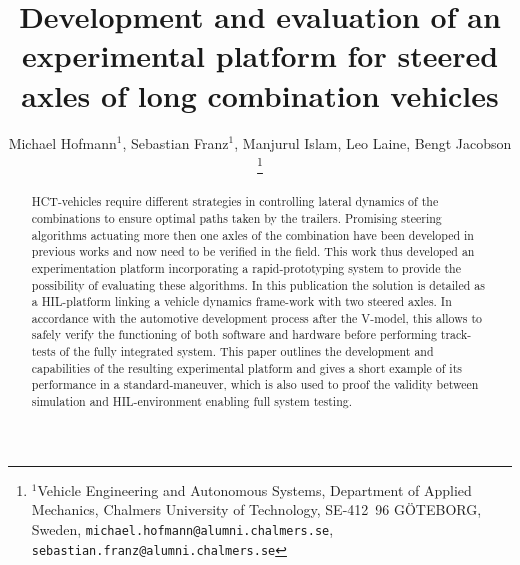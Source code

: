 \documentclass[letterpaper, 11pt, conference]{IEEEconf}      %
\title{\LARGE \bf
Development and evaluation of an experimental platform for steered axles of long combination vehicles}
\author{Michael Hofmann$^{1}$, Sebastian Franz$^{1}$, Manjurul Islam, Leo Laine, Bengt Jacobson%
	\thanks{$^{1}$Vehicle Engineering and Autonomous Systems, Department of Applied Mechanics, Chalmers University of Technology, SE-412~96 G\"OTEBORG, Sweden,
		{\tt\small michael.hofmann@alumni.chalmers.se},
		{\tt\small sebastian.franz@alumni.chalmers.se}}%
}
\begin{document}
\maketitle
\thispagestyle{empty}
\pagestyle{empty}


\begin{abstract}

\gls{HCT}-vehicles require different strategies in controlling lateral dynamics of the combinations to ensure optimal paths taken by the trailers. Promising steering algorithms actuating more then one axles of the combination have been developed in previous works \cite{Lowspeed_paper} and now need to be verified in the field. This work thus developed an experimentation platform incorporating a rapid-prototyping system to provide the possibility of evaluating these algorithms. In this publication the solution is detailed as a \gls{HIL}-platform linking a vehicle dynamics frame-work with two steered axles. In accordance with the automotive development process after the V-model\cite{automotive_software_engineering}, this allows to safely verify the functioning of both software and hardware before performing track-tests of the fully integrated system. This paper outlines the development and capabilities of the resulting experimental platform and gives a short example of its performance in a standard-maneuver, which is also used to proof the validity between simulation and \gls{HIL}-environment enabling full system testing.

\end{abstract}


















\addtolength{\textheight}{-12cm}   %
\end{document}
